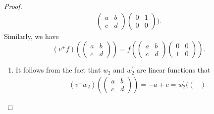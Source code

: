 \documentclass[11pt, a4paper]{amsart}
\theoremstyle{plain}
\theoremstyle{definition}
\numberwithin{equation}{section}
\begin{document}
\begin{proof}
\begin{align*}
\begin{pmatrix}
                                                                                                                 a & b \\
                                                                                                                 c & d
                                                                                                            \end{pmatrix} \begin{pmatrix}
                                                                                                                                0 & 1 \\
                                                                                                                                0 & 0
                                                                                                                            \end{pmatrix}). 
        \end{align*}
        Similarly, we have 
        \begin{equation*}
             (v^{+}f)(\begin{pmatrix}
                        a & b \\
                        c & d
                     \end{pmatrix}) = f(\begin{pmatrix}
                                            a & b \\
                                            c & d
                                        \end{pmatrix} \begin{pmatrix}
                                                            0 & 0 \\
                                                            1 & 0
                                                       \end{pmatrix}). 
        \end{equation*}
        \begin{enumerate}
        \item It follows from the fact that $w_2$ and $w_2^{\prime}$ are linear functions that 
              \begin{align*}
                  & (v^{+}w_2)(\begin{pmatrix}
                            a & b \\
                            c & d
                          \end{pmatrix}) = -a + c = w_2^{\prime}(\begin{pmatrix}

\end{pmatrix}
\end{align*}
\end{enumerate}
\end{proof}
\end{document}
